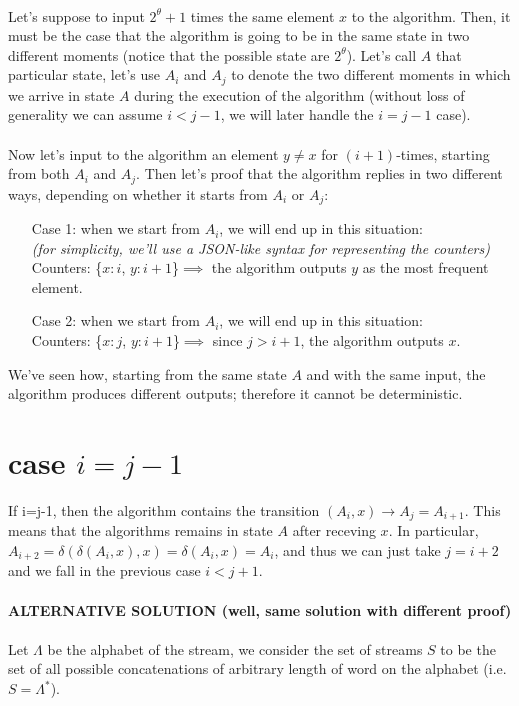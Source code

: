 \documentclass[a4paper]{article}
\begin{document}
\\
Let's suppose to input $2^{\theta}+1$ times the same element $x$ to the algorithm. Then, it must be the case that the algorithm is going to be in the same state in two different moments (notice that the possible state are $2^{\theta}$). Let's call $A$ that particular state, let's use $A_i$ and $A_j$ to denote the two different moments in which we arrive in state $A$ during the execution of the algorithm (without loss of generality we can assume $i < j-1$, we will later handle the $i=j-1$ case).
\\
\\
Now let's input to the algorithm an element $y\neq x$ for $(i+1)$-times, starting from both $A_i$ and $A_j$. Then let's proof that the algorithm replies in two different ways, depending on whether it starts from $A_i$ or $A_j$:
\begin{itemize}
\item[Case 1:] when we start from $A_i$, we will end up in this situation:\\ 
\textit{(for simplicity, we'll use a JSON-like syntax for representing the counters)}\\ Counters: \{$ x : i$,  $ y: i+1$\}$ \implies $ the algorithm outputs $y$ as the most frequent element.
\item[Case 2:] when we start from $A_i$, we will end up in this situation:\\
 Counters: \{$ x : j$,  $ y: i+1$\}$ \implies$ since $j>i+1$, the algorithm outputs $x$.
\end{itemize}
We've seen how, starting from the same state $A$ and with the same input, the algorithm produces different outputs; therefore it cannot be deterministic.

\section*{case $i=j-1$}
If i=j-1, then the algorithm contains the transition $(A_i, x) \rightarrow A_j = A_{i+1}$. This means that the algorithms remains in state $A$ after receving $x$. In particular, $A_{i+2} = \delta (\delta(A_i,x), x) = \delta(A_i, x) = A_i$, and thus we can just take $j=i+2$ and we fall in the previous case $i<j+1$.
\\
\\
\textbf{ALTERNATIVE SOLUTION (well, same solution with different proof)}
\\
\\
Let $\Lambda$ be the alphabet of the stream, we consider the set of streams $S$ to be the set of all possible concatenations of arbitrary length of word on the alphabet (i.e. $S = \Lambda^*$).
\end{document}
